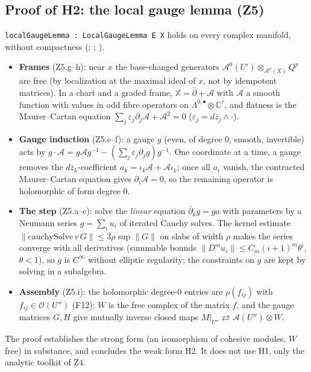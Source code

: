 \documentclass[11pt,a4paper]{article}
\newcommand{\code}[1]{\texttt{#1}}
\newcommand{\cA}{\mathcal{A}}
\newcommand{\Ocal}{\mathcal{O}}
\newcommand{\dbar}{\bar\partial}
\newcommand{\X}{\mathbb{X}}
\begin{document}
\subsection{Proof of H2: the local gauge lemma (Z5)}\label{sec:h2}
\code{localGaugeLemma : LocalGaugeLemma E X} holds on every complex manifold, without compactness
(\cite[proof of Lemma~4.1.5]{B}; \cite[\S2.2.2]{DK}; \cite[Thm~5.3]{BSW}).
\begin{itemize}
\item \textbf{Frames} (Z5.g--h): near $x$ the base-changed generators
$\cA^0(U')\otimes_{\cA^0(X)}Q^p$ are free (by localization at the maximal ideal of $x$, not by
idempotent matrices). In a chart and a graded frame, $\X=\dbar+\mathcal A$ with $\mathcal A$ a
smooth function with values in odd fibre operators on $\Lambda^{0,\bullet}\otimes\mathbb C^r$, and
flatness is the Maurer--Cartan equation $\sum_j\varepsilon_j\partial_j\mathcal A+\mathcal A^2=0$
($\varepsilon_j=d\bar z_j\wedge\cdot$).
\item \textbf{Gauge induction} (Z5.e--f): a gauge $g$ (even, of degree $0$, smooth, invertible)
acts by $g\cdot\mathcal A=g\mathcal Ag^{-1}-(\sum_j\varepsilon_j\partial_jg)g^{-1}$. One coordinate at a
time, a gauge removes the $d\bar z_k$-coefficient $a_k=\iota_k\mathcal A+\mathcal A\iota_k$; once
all $a_i$ vanish, the contracted Maurer--Cartan equation gives $\partial_i\mathcal A=0$, so the
remaining operator is holomorphic of form degree $0$.
\item \textbf{The step} (Z5.a--c): solve the \emph{linear} equation $\dbar_kg=ga$ with parameters by
a Neumann series $g=\sum_iu_i$ of iterated Cauchy solves. The kernel estimate
$\|\mathrm{cauchySolve}\,v\,G\|\le3\rho\sup\|G\|$ on slabs of width $\rho$ makes the series converge
with all derivatives (summable bounds $\|D^mu_i\|\le C_m(i+1)^m\theta^i$, $\theta<1$), so $g$ is
$C^\infty$ without elliptic regularity; the constraints on $g$ are kept by solving in a subalgebra.
\item \textbf{Assembly} (Z5.i): the holomorphic degree-$0$ entries are $\rho(f_{ij})$ with
$f_{ij}\in\Ocal(U'')$ (F12); $W$ is the free complex of the matrix $f$, and the gauge matrices
$G,H$ give mutually inverse closed maps $M|_{U''}\rightleftarrows\cA(U'')\otimes W$.
\end{itemize}
The proof establishes the strong form (an isomorphism of cohesive modules, $W$ free) in substance,
and concludes the weak form H2. It does not use H1, only the analytic toolkit of Z4.
\end{document}
